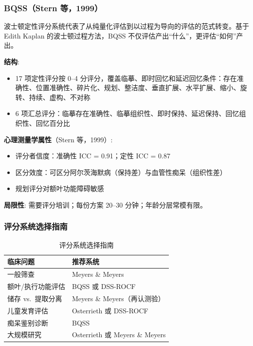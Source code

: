 \documentclass[12pt,a4paper]{ctexart}
\newcommand{\tablefontsize}{\small}
\begin{document}
\subsubsection{BQSS（Stern 等，1999）}

波士顿定性评分系统代表了从纯量化评估到以过程为导向的评估的范式转变。基于 Edith Kaplan 的波士顿过程方法，BQSS 不仅评估产出``什么''，更评估``如何''产出。

\textbf{结构}:

\begin{itemize}
\item 17 项定性评分按 0–4 分评分，覆盖临摹、即时回忆和延迟回忆条件：存在准确性、位置准确性、碎片化、规划、整洁度、垂直扩展、水平扩展、缩小、旋转、持续、虚构、不对称
\item 6 项汇总评分：临摹存在准确性、临摹组织性、即时保持、延迟保持、回忆组织性、回忆百分比
\end{itemize}

\textbf{心理测量学属性}（Stern 等，1999）:

\begin{itemize}
\item 评分者信度：准确性 ICC = 0.91；定性 ICC = 0.87
\item 区分效度：可区分阿尔茨海默病（保持差）与血管性痴呆（组织性差）
\item 规划评分对额叶功能障碍敏感
\end{itemize}

\textbf{局限性}: 需要评分培训；每份方案 20–30 分钟；年龄分层常模有限。

\subsubsection{评分系统选择指南}

\begin{table}[h!]
\centering
\tablefontsize
\caption{评分系统选择指南}
\begin{tabular}{p{6cm}p{8cm}}
\toprule
\textbf{临床问题} & \textbf{推荐系统} \\
\midrule
一般筛查 & Meyers \& Meyers \\
额叶/执行功能评估 & BQSS 或 DSS-ROCF \\
储存 vs.\ 提取分离 & Meyers \& Meyers（再认测验） \\
儿童发育评估 & Osterrieth 或 DSS-ROCF \\
痴呆鉴别诊断 & BQSS \\
大规模研究 & Osterrieth 或 Meyers \& Meyers \\
\bottomrule
\end{tabular}
\end{table}
\end{document}
